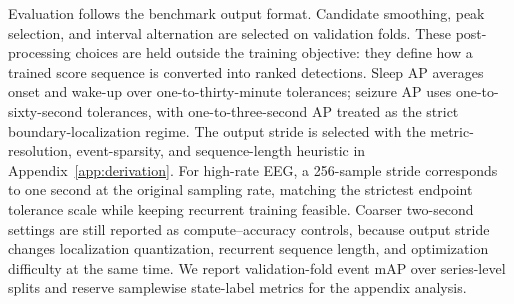 Evaluation follows the benchmark output format.
Candidate smoothing, peak selection, and interval alternation are selected on validation folds.
These post-processing choices are held outside the training objective: they define how a trained score sequence is converted into ranked detections.
Sleep AP averages onset and wake-up over one-to-thirty-minute tolerances; seizure AP uses one-to-sixty-second tolerances, with one-to-three-second AP treated as the strict boundary-localization regime.
The output stride is selected with the metric-resolution, event-sparsity, and sequence-length heuristic in Appendix~\ref{app:derivation}.
For high-rate EEG, a 256-sample stride corresponds to one second at the original sampling rate, matching the strictest endpoint tolerance scale while keeping recurrent training feasible.
Coarser two-second settings are still reported as compute--accuracy controls, because output stride changes localization quantization, recurrent sequence length, and optimization difficulty at the same time.
We report validation-fold event mAP over series-level splits and reserve samplewise state-label metrics for the appendix analysis.
